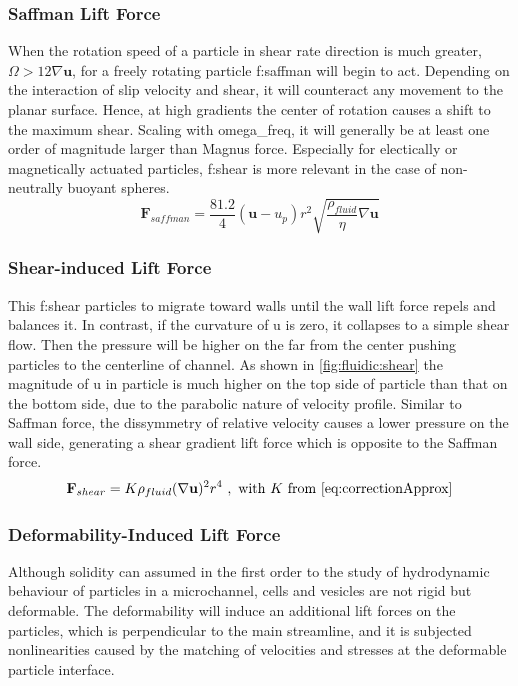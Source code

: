 \subsubsection{Saffman Lift Force}
When the rotation speed of a particle in shear rate direction is much greater, $\Omega>12\nabla\mathbf{u}$, for a freely rotating particle \gls{f:saffman} will begin to act. Depending on the interaction of slip velocity and shear, it will counteract any movement to the planar surface. Hence, at high gradients the center of rotation causes a shift to the maximum shear. \newline 
Scaling with \gls{omega_freq}, it will generally be at least one order of magnitude larger than Magnus force. Especially for electically or magnetically actuated particles, \gls{f:shear} is more relevant in the case of non-neutrally buoyant spheres.\cite{lit:fluidic:inertialFluidicsForces} 
\begin{equation}	
	\mathbf{F}_{saffman} = \frac{81.2}{4} (\mathbf{u} - u_p) r^2 \sqrt{\frac{\rho_{fluid}}{\eta} \nabla \mathbf{u}} \label{eq:f:saffman}
\end{equation}

\subsubsection{Shear-induced Lift Force}
This \gls{f:shear} particles to migrate toward walls until the wall lift force repels and balances it. In contrast, if the curvature of \gls{u} is zero, it collapses to a simple shear flow. Then the pressure will be higher on the far from the center pushing particles to the centerline of channel. As shown in \cref{fig:fluidic:shear} the magnitude of \gls{u} in particle is much higher on the top side of particle  than  that  on  the  bottom  side,  due  to  the parabolic nature of velocity profile. Similar  to  Saffman  force,  the  dissymmetry  of  relative  velocity  causes  a  lower  pressure  on the wall side, generating a shear gradient lift force which is opposite to the Saffman force.\cite{lit:fluidic:inertialFluidicsForces} 
\begin{equation}	
	\mathbf{F}_{shear} = K \rho_{fluid} (\nabla \mathbf{u})^2 r^4\ \mathrm{, \ with\ } K \ \mathrm{ from }\  \cref{eq:correctionApprox} \label{eq:f:shear}
\end{equation}

\subsubsection{Deformability-Induced Lift Force}
Although solidity can assumed in the first order to the study of hydrodynamic behaviour of particles in a microchannel, cells and vesicles are not  rigid  but  deformable. The deformability  will  induce an additional  lift  forces on the particles, which is perpendicular to the main streamline, and it is subjected nonlinearities  caused  by  the matching   of   velocities   and   stresses   at   the   deformable   particle interface. 

